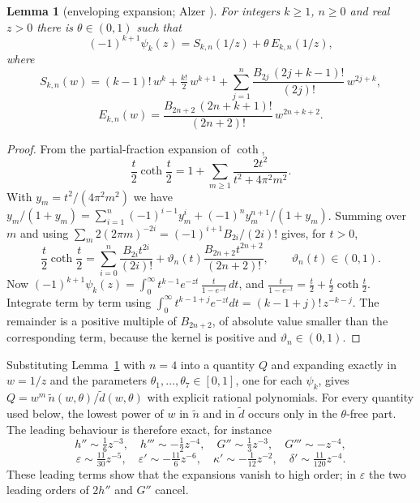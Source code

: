 \documentclass[11pt,a4paper]{article}
\newtheorem{lemma}[theorem]{Lemma}
\theoremstyle{definition}
\theoremstyle{remark}
\newcommand{\eps}{\varepsilon}
\begin{document}
\begin{lemma}[enveloping expansion; Alzer \cite{Alz97}]\label{lem:alzer}
For integers $k\ge1$, $n\ge0$ and real $z>0$ there is $\theta\in(0,1)$ such that
\[
(-1)^{k+1}\psi_k(z)=S_{k,n}(1/z)+\theta\,E_{k,n}(1/z),
\]
where
\[
S_{k,n}(w)=(k-1)!\,w^k+\tfrac{k!}2\,w^{k+1}+\sum_{j=1}^{n}\frac{B_{2j}\,(2j+k-1)!}{(2j)!}\,w^{2j+k},
\]
\[
E_{k,n}(w)=\frac{B_{2n+2}\,(2n+k+1)!}{(2n+2)!}\,w^{2n+k+2}.
\]
\end{lemma}
\begin{proof}
From the partial-fraction expansion of $\coth$,
\[
\frac t2\coth\frac t2=1+\sum_{m\ge1}\frac{2t^2}{t^2+4\pi^2m^2}.
\]
With $y_m=t^2/(4\pi^2m^2)$ we have $y_m/(1+y_m)=\sum_{i=1}^n(-1)^{i-1}y_m^i+(-1)^ny_m^{n+1}/(1+y_m)$. Summing over $m$ and using $\sum_m2(2\pi m)^{-2i}=(-1)^{i+1}B_{2i}/(2i)!$ gives, for $t>0$,
\[
\frac t2\coth\frac t2=\sum_{i=0}^n\frac{B_{2i}t^{2i}}{(2i)!}+\vartheta_n(t)\frac{B_{2n+2}t^{2n+2}}{(2n+2)!},\qquad\vartheta_n(t)\in(0,1).
\]
Now $(-1)^{k+1}\psi_k(z)=\int_0^\infty t^{k-1}e^{-zt}\,\frac{t}{1-e^{-t}}\,dt$, and $\frac t{1-e^{-t}}=\frac t2+\frac t2\coth\frac t2$. Integrate term by term using $\int_0^\infty t^{k-1+j}e^{-zt}dt=(k-1+j)!\,z^{-k-j}$. The remainder is a positive multiple of $B_{2n+2}$, of absolute value smaller than the corresponding term, because the kernel is positive and $\vartheta_n\in(0,1)$.
\end{proof}

Substituting Lemma~\ref{lem:alzer} with $n=4$ into a quantity $Q$ and expanding exactly in $w=1/z$ and the parameters $\theta_1,\dots,\theta_7\in[0,1]$, one for each $\psi_k$, gives $Q=w^m\,\tilde n(w,\theta)/\tilde d(w,\theta)$ with explicit rational polynomials. For every quantity used below, the lowest power of $w$ in $\tilde n$ and in $\tilde d$ occurs only in the $\theta$-free part. The leading behaviour is therefore exact, for instance
\[
h''\sim\tfrac16z^{-3},\quad h'''\sim-\tfrac12z^{-4},\quad G''\sim\tfrac13z^{-3},\quad G'''\sim-z^{-4},
\]
\[
\eps\sim\tfrac{11}{30}z^{-5},\quad \eps'\sim-\tfrac{11}6z^{-6},\quad \kappa'\sim-\tfrac1{12}z^{-2},\quad \delta'\sim\tfrac{11}{120}z^{-4}.
\]
These leading terms show that the expansions vanish to high order; in $\eps$ the two leading orders of $2h''$ and $G''$ cancel.
\end{document}

